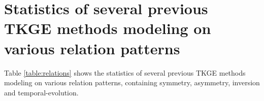 \documentclass[11pt]{article}
\begin{document}
\section{Statistics of several previous TKGE methods modeling on various relation patterns}
\label{app:Statistics}

Table \ref{table:relations} shows the statistics of several previous TKGE methods modeling on various relation patterns, containing symmetry, asymmetry, inversion and temporal-evolution. 

\begin{table}[t!]
\centering
{}
\caption{Statistics of several previous TKGE methods modeling on various relation patterns.}
\label{table:relations}
\end{table}
\end{document}

